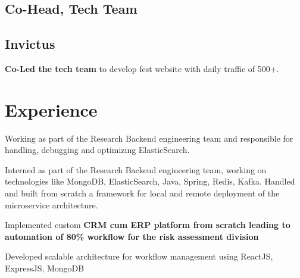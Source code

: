 \documentclass[]{ishaan-kamra-resume}
\begin{document}
\begin{minipage}[t]{0.33\textwidth}
    \subsection{Co-Head, Tech Team}
    \subsection{Invictus}
    \textbullet{} \textbf{Co-Led the tech team} to develop fest website with daily traffic of 500+.
    \sectionsep


\end{minipage}
\hfill
\begin{minipage}[t]{0.66\textwidth}


    \section{Experience}
    \vspace{\topsep} %
    \begin{tightemize}
        \item Working as part of the  Research Backend engineering team and responsible for handling, debugging and optimizing ElasticSearch.
    \end{tightemize}
    \sectionsep

    \begin{tightemize}
        \item Interned as part of the  Research Backend engineering team, working on technologies like MongoDB, ElasticSearch, Java, Spring, Redis, Kafka. Handled and built from scratch a framework for local and remote deployment of the microservice architecture.
    \end{tightemize}
    \sectionsep

    \begin{tightemize}
        \item Implemented custom \textbf{CRM cum ERP platform from scratch leading to automation of 80\% workflow for the risk assessment division}
        \item Developed scalable architecture for workflow management using ReactJS, ExpressJS, MongoDB
    \end{tightemize}
    \sectionsep


\end{minipage}
\end{document}
